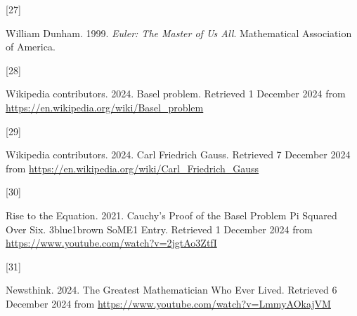 \documentclass[
  a4paper,
]{article}
\newlength{\cslhangindent}
\newlength{\csllabelwidth}
\newenvironment{CSLReferences}[2] %
 {\begin{list}{}{%
  \setlength{\itemindent}{0pt}
  \setlength{\leftmargin}{0pt}
  \setlength{\parsep}{0pt}
  \ifodd #1
   \setlength{\leftmargin}{\cslhangindent}
   \setlength{\itemindent}{-1\cslhangindent}
  \fi
  \setlength{\itemsep}{#2\baselineskip}}}
 {\end{list}}
\newcommand{\CSLLeftMargin}[1]{\parbox[t]{\csllabelwidth}{\strut#1\strut}}
\newcommand{\CSLRightInline}[1]{\parbox[t]{\linewidth - \csllabelwidth}{\strut#1\strut}}
\begin{document}
\begin{CSLReferences}{0}{0}
\CSLLeftMargin{{[}27{]} }%
\CSLRightInline{William Dunham. 1999. \emph{{Euler: The Master of Us
All}}. Mathematical Association of America.}

\CSLLeftMargin{{[}28{]} }%
\CSLRightInline{Wikipedia contributors. 2024. {Basel problem}. Retrieved
1 December 2024 from \url{https://en.wikipedia.org/wiki/Basel_problem}}

\CSLLeftMargin{{[}29{]} }%
\CSLRightInline{Wikipedia contributors. 2024. {Carl Friedrich Gauss}.
Retrieved 7 December 2024 from
\url{https://en.wikipedia.org/wiki/Carl_Friedrich_Gauss}}

\CSLLeftMargin{{[}30{]} }%
\CSLRightInline{Rise to the Equation. 2021. {Cauchy's Proof of the Basel
Problem \textbar{} Pi Squared Over Six}. {3blue1brown SoME1 Entry}.
Retrieved 1 December 2024 from
\url{https://www.youtube.com/watch?v=2jgtAo3ZtfI}}

\CSLLeftMargin{{[}31{]} }%
\CSLRightInline{Newsthink. 2024. {The Greatest Mathematician Who Ever
Lived}. Retrieved 6 December 2024 from
\url{https://www.youtube.com/watch?v=LmmyAOkajVM}}

\end{CSLReferences}
\end{document}

